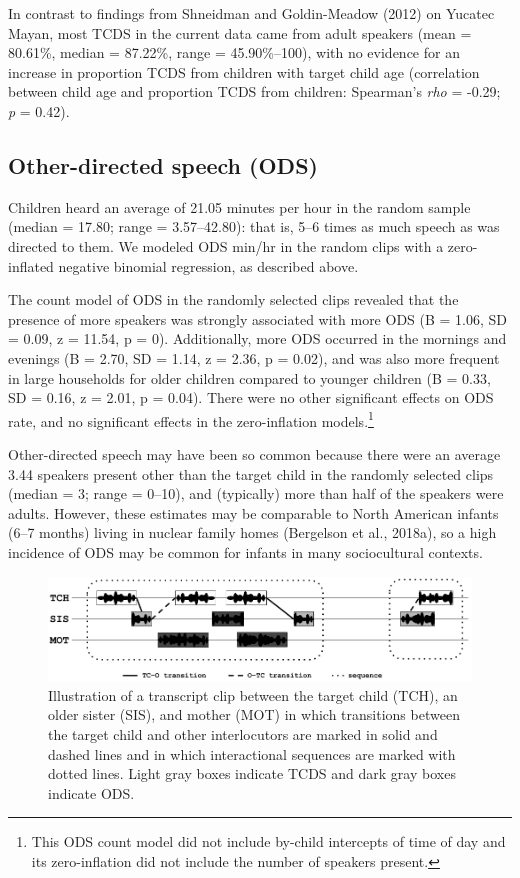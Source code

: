\documentclass[floatsintext,man]{apa6}
\theoremstyle{definition}
\theoremstyle{definition}
\theoremstyle{definition}
\theoremstyle{remark}
\begin{document}
In contrast to findings from Shneidman and Goldin-Meadow (2012) on
Yucatec Mayan, most TCDS in the current data came from adult speakers
(mean = 80.61\%, median = 87.22\%, range = 45.90\%--100), with no
evidence for an increase in proportion TCDS from children with target
child age (correlation between child age and proportion TCDS from
children: Spearman's \emph{rho} = -0.29; \emph{p} = 0.42).

\subsection{Other-directed speech
(ODS)}\label{other-directed-speech-ods}

Children heard an average of 21.05 minutes per hour in the random sample
(median = 17.80; range = 3.57--42.80): that is, 5--6 times as much
speech as was directed to them. We modeled ODS min/hr in the random
clips with a zero-inflated negative binomial regression, as described
above.

The count model of ODS in the randomly selected clips revealed that the
presence of more speakers was strongly associated with more ODS (B =
1.06, SD = 0.09, z = 11.54, p = 0). Additionally, more ODS occurred in
the mornings and evenings (B = 2.70, SD = 1.14, z = 2.36, p = 0.02), and
was also more frequent in large households for older children compared
to younger children (B = 0.33, SD = 0.16, z = 2.01, p = 0.04). There
were no other significant effects on ODS rate, and no significant
effects in the zero-inflation models.\footnote{This ODS count model did
  not include by-child intercepts of time of day and its zero-inflation
  did not include the number of speakers present.}

Other-directed speech may have been so common because there were an
average 3.44 speakers present other than the target child in the
randomly selected clips (median = 3; range = 0--10), and (typically)
more than half of the speakers were adults. However, these estimates may
be comparable to North American infants (6--7 months) living in nuclear
family homes (Bergelson et al., 2018a), so a high incidence of ODS may
be common for infants in many sociocultural contexts.

\begin{figure}

{\centering \includegraphics[width=1\linewidth]{Tseltal-CLE_files/TseltalCLE-TurnTimingIllustration} 

}

\caption{Illustration of a transcript clip between the target child (TCH), an older sister (SIS), and mother (MOT) in which transitions between the target child and other interlocutors are marked in solid and dashed lines and in which interactional sequences are marked with dotted lines. Light gray boxes indicate TCDS and dark gray boxes indicate ODS.}\label{fig:fig6}
\end{figure}
\end{document}
